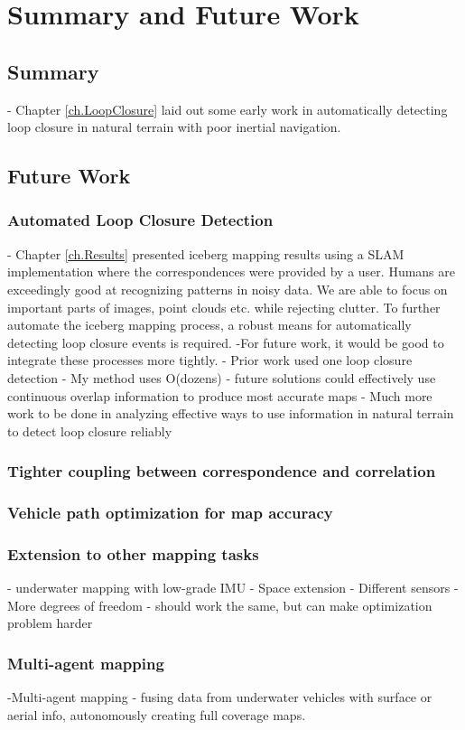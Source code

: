 
\chapter{Summary and Future Work}
\label{ch.FutureWork}

\section{Summary}
- Chapter \ref{ch.LoopClosure} laid out some early work in automatically detecting loop closure in natural terrain with poor inertial navigation. 

\section{Future Work}

\subsection{Automated Loop Closure Detection}
- Chapter \ref{ch.Results} presented iceberg mapping results using a SLAM implementation where the correspondences were provided by a user. Humans are exceedingly good at recognizing patterns in noisy data. We are able to focus on important parts of images, point clouds etc. while rejecting clutter. To further automate the iceberg mapping process, a robust means for automatically detecting loop closure events is required. 
-For future work, it would be good to integrate these processes more tightly.
	- Prior work used one loop closure detection
	- My method uses O(dozens)
	- future solutions could effectively use continuous overlap information to produce most accurate maps
- Much more work to be done in analyzing effective ways to use information in natural terrain to detect loop closure reliably

\subsection{Tighter coupling between correspondence and correlation}

\subsection{Vehicle path optimization for map accuracy}

\subsection{Extension to other mapping tasks}
- underwater mapping with low-grade IMU 
- Space extension 
	- Different sensors
	- More degrees of freedom - should work the same, but can make optimization problem harder
	
\subsection{Multi-agent mapping}
-Multi-agent mapping
	- fusing data from underwater vehicles with surface or aerial info, autonomously creating full coverage maps.